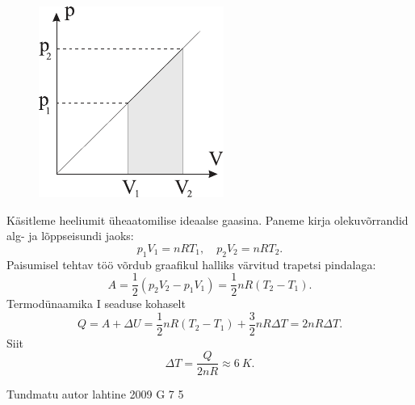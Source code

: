 \documentclass[11pt]{article}
\begin{document}
{{\ifSolution
\begin{figure}
	\begin{center}
		\vspace{-25pt}
		\includegraphics[width=0.95\linewidth]{2008-lahg-06-lah}
	\end{center}
\end{figure}
Käsitleme heeliumit üheaatomilise ideaalse gaasina. 
Paneme kirja olekuvõrrandid alg- ja lõppseisundi jaoks:
\[
p_1V_1 = nRT_1, \quad p_2V_2 = nRT_2.
\]
Paisumisel tehtav töö võrdub graafikul halliks värvitud
trapetsi pindalaga:
\[
A = \frac 12 (p_2V_2 - p_1V_1) = \frac 12 nR(T_2 - T_1).
\]
Termodünaamika I seaduse kohaselt 
\[
Q = A + \Delta U = \frac 12 nR(T_2 - T_1) + \frac 32 nR\Delta T = 2nR\Delta T.
\]
Siit
\[
\Delta T =\frac {Q}{2nR} \approx \SI{6}{K}.
\]
\fi
}

{Tundmatu autor} %
{lahtine} %
{2009} %
{G 7} %
{5} %
{

}}
\end{document}
